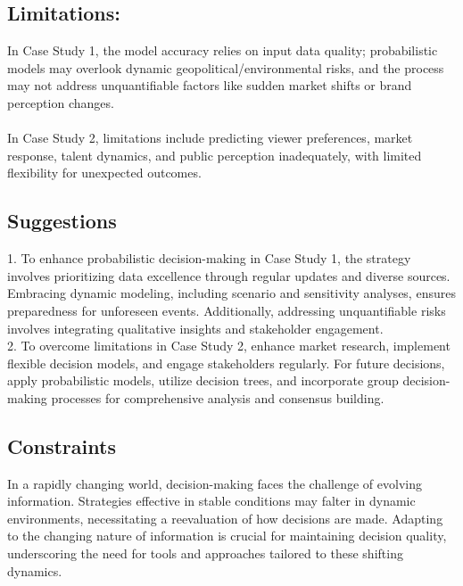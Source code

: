 \documentclass{article}
\begin{document}
\subsection{Limitations:}
In Case Study 1, the model accuracy relies on input data quality; probabilistic models may overlook dynamic geopolitical/environmental risks, and the process may not address unquantifiable factors like sudden market shifts or brand perception changes.
\\
\\
In Case Study 2, limitations include predicting viewer preferences, market response, talent dynamics, and public perception inadequately, with limited flexibility for unexpected outcomes. 
\subsection{Suggestions}
1. To enhance probabilistic decision-making in Case Study 1, the strategy involves prioritizing data excellence through regular updates and diverse sources. Embracing dynamic modeling, including scenario and sensitivity analyses, ensures preparedness for unforeseen events. Additionally, addressing unquantifiable risks involves integrating qualitative insights and stakeholder engagement.
\\
2. To overcome limitations in Case Study 2, enhance market research, implement flexible decision models, and engage stakeholders regularly. For future decisions, apply probabilistic models, utilize decision trees, and incorporate group decision-making processes for comprehensive analysis and consensus building.

\subsection{Constraints}
In a rapidly changing world, decision-making faces the challenge of evolving information. Strategies effective in stable conditions may falter in dynamic environments, necessitating a reevaluation of how decisions are made. Adapting to the changing nature of information is crucial for maintaining decision quality, underscoring the need for tools and approaches tailored to these shifting dynamics.\cite{walton2020limitations}
\end{document}
